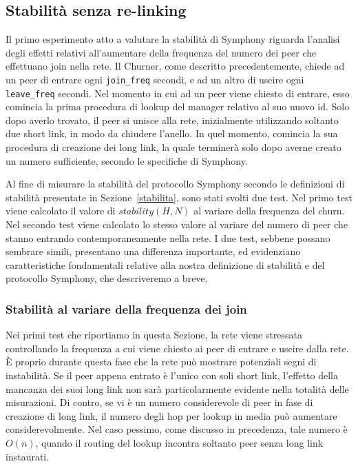 \documentclass[prodmode,acmtap]{acmlarge}
\begin{document}
\subsection{Stabilità senza re-linking}
Il primo esperimento atto a valutare la stabilità di Symphony riguarda l'analisi degli effetti relativi all'aumentare della frequenza del numero dei peer che effettuano join nella rete.
Il Churner, come descritto precedentemente, chiede ad un peer di entrare ogni \texttt{join\_freq} secondi, e ad un altro di uscire ogni \texttt{leave\_freq} secondi. Nel momento in cui ad un peer viene chiesto di entrare, esso comincia la prima procedura di lookup del manager relativo al suo nuovo id. Solo dopo averlo trovato, il peer si unisce alla rete, inizialmente utilizzando soltanto due short link, in modo da chiudere l'anello. In quel momento, comincia la sua procedura di creazione dei long link, la quale terminerà solo dopo averne creato un numero sufficiente, secondo le specifiche di Symphony.

Al fine di misurare la stabilità del protocollo Symphony secondo le definizioni di stabilità presentate in Sezione~\ref{stabilita}, sono stati svolti due test. Nel primo test viene calcolato il valore di $stability(H,N)$ al variare della frequenza del churn. Nel secondo test viene calcolato lo stesso valore al variare del numero di peer che stanno entrando contemporaneamente nella rete. I due test, sebbene possano sembrare simili, presentano una differenza importante, ed evidenziano caratteristiche fondamentali relative alla nostra definizione di stabilità e del protocollo Symphony, che descriveremo a breve.


\subsubsection{Stabilità al variare della frequenza dei join}

Nei primi test che riportiamo in questa Sezione, la rete viene stressata controllando la frequenza a cui viene chiesto ai peer di entrare e uscire dalla rete.
È proprio durante questa fase che la rete può mostrare potenziali segni di instabilità. Se il peer appena entrato è l'unico con soli short link, l'effetto della mancanza dei suoi long link non sarà particolarmente evidente nella totalità delle misurazioni.
Di contro, se vi è un numero considerevole di peer in fase di creazione di long link, il numero degli hop per lookup in media può aumentare considerevolmente. Nel caso pessimo, come discusso in precedenza, tale numero è $O(n)$, quando il routing del lookup incontra soltanto peer senza long link instaurati.
\end{document}
